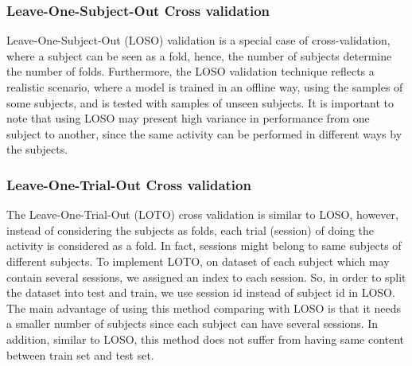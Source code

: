 \documentclass[journal,article,submit,moreauthors,pdftex]{Definitions/mdpi}
\begin{document}
\subsubsection{Leave-One-Subject-Out Cross validation}
Leave-One-Subject-Out (LOSO) validation is a special case of cross-validation, where a subject can be seen as a fold, hence, the number of subjects determine the number of folds. Furthermore, the LOSO validation technique reflects a realistic scenario, where a model is trained in an offline way, using the samples of some subjects, and is tested with samples of unseen subjects. It is important to note that using LOSO may present high variance in performance from one subject to another, since the same activity can be performed in different ways by the subjects. 

\subsubsection{Leave-One-Trial-Out Cross validation}
The Leave-One-Trial-Out (LOTO) cross validation is similar to LOSO, however, instead of considering the subjects as folds, each trial (session) of doing the activity is considered as a fold. In fact, sessions might belong to same subjects of different subjects. To implement LOTO, on dataset of each subject which may contain several sessions, we assigned an index to each session. So, in order to split the dataset into test and train, we use session id instead of subject id in LOSO. The main advantage of using this method comparing with LOSO is that it needs a smaller number of subjects since each subject can have several sessions. In addition, similar to LOSO, this method does not suffer from having same content between train set and test set.\\
\end{document}
